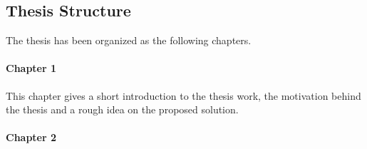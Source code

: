 \subsection{Thesis Structure}
The thesis has been organized as the following chapters.
\paragraph{Chapter 1} This chapter gives a short introduction to the thesis work, the motivation behind the thesis and a rough idea on the proposed solution.
\paragraph{Chapter 2}